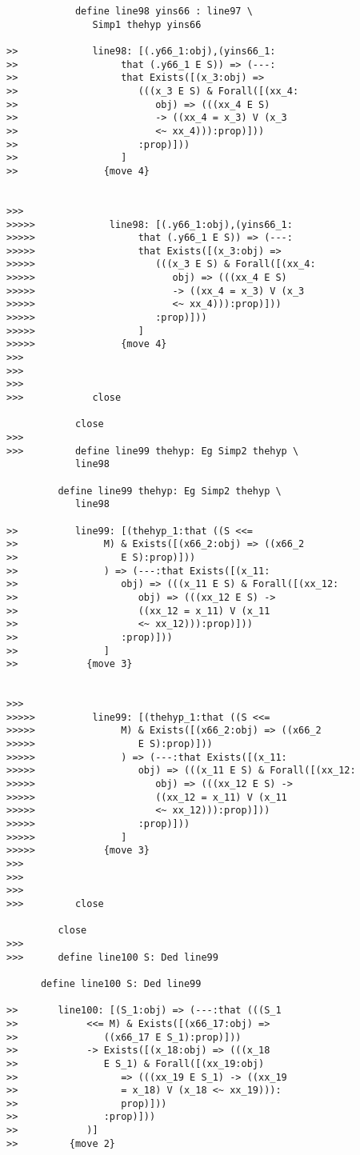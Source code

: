 \documentclass[12pt]{article}
\begin{document}
\begin{verbatim}
            define line98 yins66 : line97 \
               Simp1 thehyp yins66

>>             line98: [(.y66_1:obj),(yins66_1:
>>                  that (.y66_1 E S)) => (---:
>>                  that Exists([(x_3:obj) =>
>>                     (((x_3 E S) & Forall([(xx_4:
>>                        obj) => (((xx_4 E S)
>>                        -> ((xx_4 = x_3) V (x_3
>>                        <~ xx_4))):prop)]))
>>                     :prop)]))
>>                  ]
>>               {move 4}


>>>
>>>>>             line98: [(.y66_1:obj),(yins66_1:
>>>>>                  that (.y66_1 E S)) => (---:
>>>>>                  that Exists([(x_3:obj) =>
>>>>>                     (((x_3 E S) & Forall([(xx_4:
>>>>>                        obj) => (((xx_4 E S)
>>>>>                        -> ((xx_4 = x_3) V (x_3
>>>>>                        <~ xx_4))):prop)]))
>>>>>                     :prop)]))
>>>>>                  ]
>>>>>               {move 4}
>>>
>>>
>>>
>>>            close

            close
>>>
>>>         define line99 thehyp: Eg Simp2 thehyp \
            line98

         define line99 thehyp: Eg Simp2 thehyp \
            line98

>>          line99: [(thehyp_1:that ((S <<=
>>               M) & Exists([(x66_2:obj) => ((x66_2
>>                  E S):prop)]))
>>               ) => (---:that Exists([(x_11:
>>                  obj) => (((x_11 E S) & Forall([(xx_12:
>>                     obj) => (((xx_12 E S) ->
>>                     ((xx_12 = x_11) V (x_11
>>                     <~ xx_12))):prop)]))
>>                  :prop)]))
>>               ]
>>            {move 3}


>>>
>>>>>          line99: [(thehyp_1:that ((S <<=
>>>>>               M) & Exists([(x66_2:obj) => ((x66_2
>>>>>                  E S):prop)]))
>>>>>               ) => (---:that Exists([(x_11:
>>>>>                  obj) => (((x_11 E S) & Forall([(xx_12:
>>>>>                     obj) => (((xx_12 E S) ->
>>>>>                     ((xx_12 = x_11) V (x_11
>>>>>                     <~ xx_12))):prop)]))
>>>>>                  :prop)]))
>>>>>               ]
>>>>>            {move 3}
>>>
>>>
>>>
>>>         close

         close
>>>
>>>      define line100 S: Ded line99

      define line100 S: Ded line99

>>       line100: [(S_1:obj) => (---:that (((S_1
>>            <<= M) & Exists([(x66_17:obj) =>
>>               ((x66_17 E S_1):prop)]))
>>            -> Exists([(x_18:obj) => (((x_18
>>               E S_1) & Forall([(xx_19:obj)
>>                  => (((xx_19 E S_1) -> ((xx_19
>>                  = x_18) V (x_18 <~ xx_19))):
>>                  prop)]))
>>               :prop)]))
>>            )]
>>         {move 2}



\end{verbatim}
\end{document}
